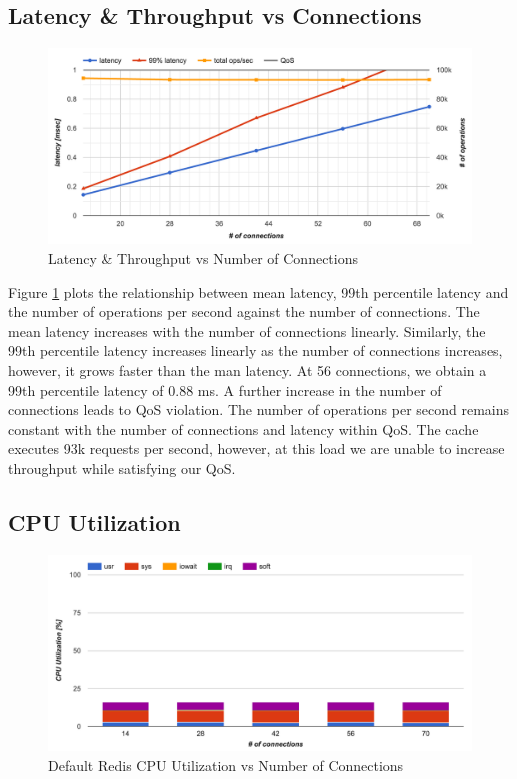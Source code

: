 \subsection{Latency \& Throughput vs Connections}
\begin{figure}[h]
    \includegraphics[width=\textwidth]{./res2/r_baseline_latency.png}
    \caption{Latency \& Throughput vs Number of Connections}
    \label{fig:r_baseline_latency}
\end{figure}

Figure \ref{fig:r_baseline_latency} plots the relationship between mean latency, 99th percentile latency and the number of operations per second against the number of connections.
The mean latency increases with the number of connections linearly. Similarly, the 99th percentile latency increases linearly as the number of connections increases, however, it grows faster than the man latency. At 56 connections, we obtain a 99th percentile latency of 0.88 ms. A further increase in the number of connections leads to QoS violation.
The number of operations per second remains constant with the number of connections and latency within QoS. The cache executes 93k requests per second, however, at this load we are unable to increase throughput while satisfying our QoS.

\subsection{CPU Utilization}
\begin{figure}[h]
    \includegraphics[width=\textwidth]{./res2/r_baseline_cpu.png}
    \caption{Default Redis CPU Utilization vs Number of Connections}
    \label{fig:r_baseline_cpu}
\end{figure}

